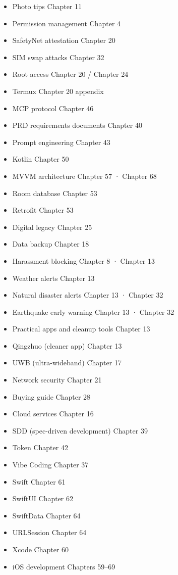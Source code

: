 
\begin{itemize}
  \item Photo tips Chapter 11
  \item Permission management Chapter 4
  \item SafetyNet attestation Chapter 20
  \item SIM swap attacks Chapter 32
  \item Root access Chapter 20 / Chapter 24
  \item Termux Chapter 20 appendix
  \item MCP protocol Chapter 46
  \item PRD requirements documents Chapter 40
  \item Prompt engineering Chapter 43
  \item Kotlin Chapter 50
  \item MVVM architecture Chapter 57 · Chapter 68
  \item Room database Chapter 53
  \item Retrofit Chapter 53
\end{itemize}


\begin{itemize}
  \item Digital legacy Chapter 25
  \item Data backup Chapter 18
  \item Harassment blocking Chapter 8 · Chapter 13
  \item Weather alerts Chapter 13
  \item Natural disaster alerts Chapter 13 · Chapter 32
  \item Earthquake early warning Chapter 13 · Chapter 32
  \item Practical apps and cleanup tools Chapter 13
  \item Qingzhuo (cleaner app) Chapter 13
  \item UWB (ultra-wideband) Chapter 17
  \item Network security Chapter 21
  \item Buying guide Chapter 28
  \item Cloud services Chapter 16
  \item SDD (spec-driven development) Chapter 39
  \item Token Chapter 42
  \item Vibe Coding Chapter 37
  \item Swift Chapter 61
  \item SwiftUI Chapter 62
  \item SwiftData Chapter 64
  \item URLSession Chapter 64
  \item Xcode Chapter 60
  \item iOS development Chapters 59–69
\end{itemize}

